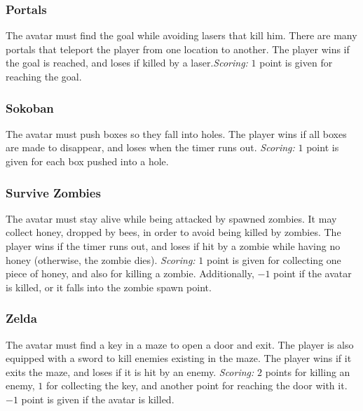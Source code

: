 \documentclass[conference]{IEEEtran}
\begin{document}
\subsubsection{Portals} The avatar must find the goal while avoiding lasers that kill him. There are many portals that teleport the player from one location to another. The player wins if the goal is reached, and loses if killed by a laser.\textit{Scoring:} $1$ point is given for reaching the goal. 

\subsubsection{Sokoban} The avatar must push boxes so they fall into holes. The player wins if all boxes are made to disappear, and loses when the timer runs out. \textit{Scoring:} $1$ point is given for each box pushed into a hole. 

\subsubsection{Survive Zombies} The avatar must stay alive while being attacked by spawned zombies. It may collect honey, dropped by bees, in order to avoid being killed by zombies. The player wins if the timer runs out, and loses if hit by a zombie while having no honey (otherwise, the zombie dies). \textit{Scoring:} $1$ point is given for collecting one piece of honey, and also for killing a zombie. Additionally, $-1$ point if the avatar is killed, or it falls into the zombie spawn point.

\subsubsection{ Zelda} The avatar must find a key in a maze to open a door and exit. The player is also equipped with a sword to kill enemies existing in the maze. The player wins if it exits the maze, and loses if it is hit by an enemy. \textit{Scoring:} $2$ points for killing an enemy, $1$ for collecting the key, and another point for reaching the door with it. $-1$ point is given if the avatar is killed. 
\end{document}
